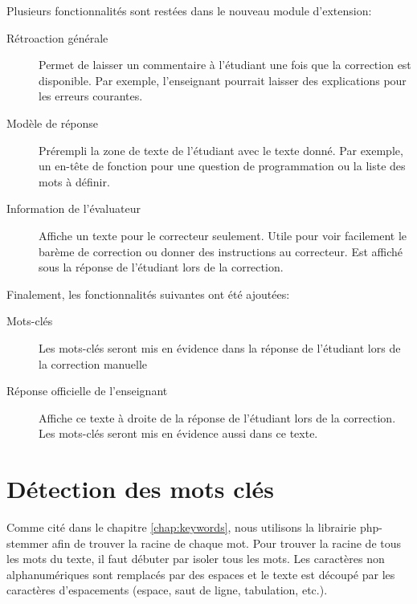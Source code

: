 Plusieurs fonctionnalités sont restées dans le nouveau module d'extension:

\begin{description}
  \item[Rétroaction générale]
  
  Permet de laisser un commentaire à l'étudiant une fois que la correction est disponible.
  Par exemple, l'enseignant pourrait laisser des explications pour les erreurs courantes.
  
  \item[Modèle de réponse]
  
  Prérempli la zone de texte de l'étudiant avec le texte donné.
  Par exemple, un en-tête de fonction pour une question de programmation ou la liste des mots à définir.
  
  \item[Information de l'évaluateur]
  
  Affiche un texte pour le correcteur seulement.
  Utile pour voir facilement le barème de correction ou donner des instructions au correcteur.
  Est affiché sous la réponse de l'étudiant lors de la correction.
\end{description}

Finalement, les fonctionnalités suivantes ont été ajoutées:

\begin{description}
  \item[Mots-clés]
  
  Les mots-clés seront mis en évidence dans la réponse de l'étudiant lors de la correction manuelle

  \item[Réponse officielle de l'enseignant]
  
  Affiche ce texte à droite de la réponse de l'étudiant lors de la correction.
  Les mots-clés seront mis en évidence aussi dans ce texte.
\end{description}

\section{Détection des mots clés}

Comme cité dans le chapitre \autoref{chap:keywords}, nous utilisons la librairie \og php-stemmer \fg{} afin de trouver la racine de chaque mot.
Pour trouver la racine de tous les mots du texte, il faut débuter par isoler tous les mots.
Les caractères non alphanumériques sont remplacés par des espaces et le texte est découpé par les caractères d'espacements (espace, saut de ligne, tabulation, etc.).

